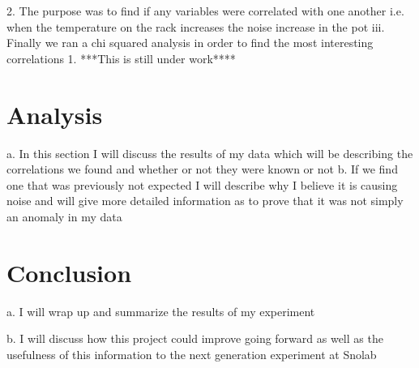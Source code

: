 2.	The purpose was to find if any variables were correlated with one another i.e. when the temperature on the rack increases the noise increase in the pot
iii.	Finally we ran a chi squared analysis in order to find the most interesting correlations
1.	***This is still under work****
\section{Analysis} 
a.	In this section I will discuss the results of my data which will be describing the correlations we found and whether or not they were known or not
b.	If we find one that was previously not expected I will describe why I believe it is causing noise and will give more detailed information as to prove that it was not simply an anomaly in my data
\section{Conclusion}
a.	I will wrap up and summarize the results of my experiment

b.	I will discuss how this project could improve going forward as well as the usefulness of this information to the next generation experiment at Snolab
